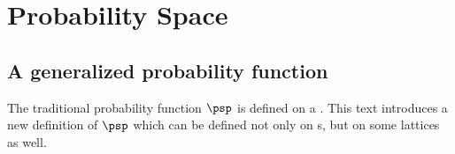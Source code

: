 \chapter{Probability Space}
\label{chp:prbspace}

\section{A generalized probability function}
The traditional probability function $\psp$ is defined on a .
This text introduces a new definition of $\psp$ which can be defined not only on 
s, but on some  lattices as well.

